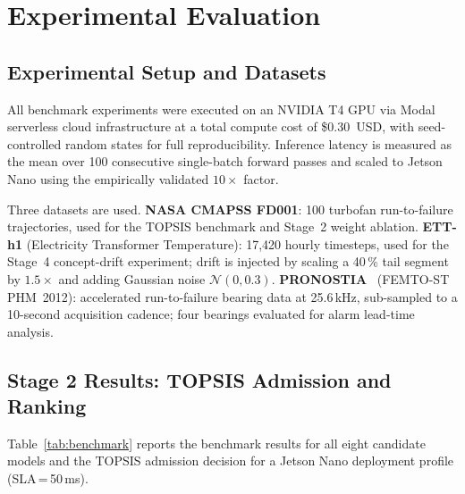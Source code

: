 \documentclass[12pt,a4paper]{article}
\begin{document}
\section{Experimental Evaluation}
\label{sec:eval}

\subsection{Experimental Setup and Datasets}
\label{subsec:setup}

All benchmark experiments were executed on an NVIDIA T4 GPU via
Modal serverless cloud infrastructure at a total compute cost of
\$0.30~USD, with seed-controlled random states for full
reproducibility.
Inference latency is measured as the mean over 100 consecutive
single-batch forward passes and scaled to Jetson Nano using the
empirically validated $10\times$ factor.

Three datasets are used.
\textbf{NASA CMAPSS FD001}: 100 turbofan run-to-failure trajectories,
used for the TOPSIS benchmark and Stage~2 weight ablation.
\textbf{ETT-h1} (Electricity Transformer Temperature):
17{,}420 hourly timesteps, used for the Stage~4 concept-drift
experiment; drift is injected by scaling a 40\,\% tail segment
by $1.5\times$ and adding Gaussian noise $\mathcal{N}(0,0.3)$.
\textbf{PRONOSTIA}~\cite{nectoux2012pronostia} (FEMTO-ST PHM~2012):
accelerated run-to-failure bearing data at 25.6\,kHz,
sub-sampled to a 10-second acquisition cadence; four bearings
evaluated for alarm lead-time analysis.

\subsection{Stage 2 Results: TOPSIS Admission and Ranking}
\label{subsec:results-topsis}

Table~\ref{tab:benchmark} reports the benchmark results for all eight
candidate models and the TOPSIS admission decision for a Jetson Nano
deployment profile (SLA\,=\,50\,ms).
\end{document}
